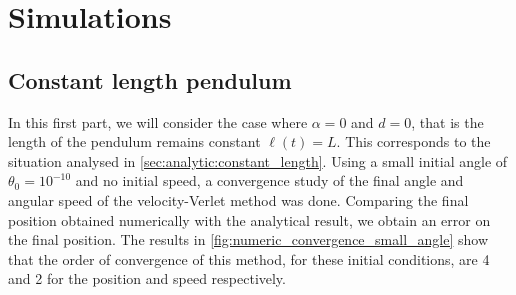 \section{Simulations}

\subsection{Constant length pendulum}

In this first part, we will consider the case where \(\alpha=0\) and \(d=0\), that is the length of the pendulum remains constant \(\ell(t)=L\). This corresponds to the situation analysed in \autoref{sec:analytic:constant_length}. Using a small initial angle of \(\theta_0=10^{-10}\) and no initial speed, a convergence study of the final angle and angular speed of the velocity-Verlet method was done. Comparing the final position obtained numerically with the analytical result, we obtain an error on the final position. The results in \autoref{fig:numeric_convergence_small_angle} show that the order of convergence of this method, for these initial conditions, are 4 and 2 for the position and speed respectively.

